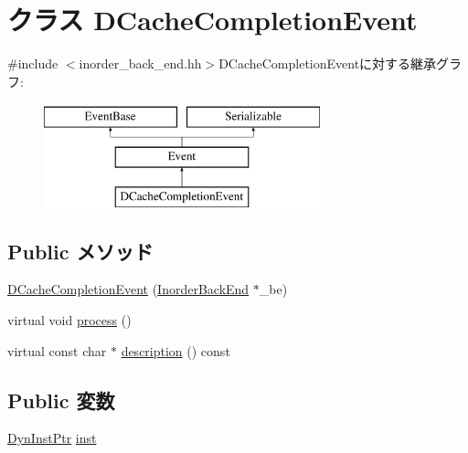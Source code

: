 \hypertarget{classInorderBackEnd_1_1DCacheCompletionEvent}{
\section{クラス DCacheCompletionEvent}
\label{classInorderBackEnd_1_1DCacheCompletionEvent}
}


{\ttfamily \#include $<$inorder\_\-back\_\-end.hh$>$}DCacheCompletionEventに対する継承グラフ:\begin{figure}[H]
\begin{center}
\leavevmode
\includegraphics[height=3cm]{classInorderBackEnd_1_1DCacheCompletionEvent}
\end{center}
\end{figure}
\subsection*{Public メソッド}
\begin{DoxyCompactItemize}
\item 
\hyperlink{classInorderBackEnd_1_1DCacheCompletionEvent_a58396b39cb5df3ad178cfed0d1992c1c}{DCacheCompletionEvent} (\hyperlink{classInorderBackEnd}{InorderBackEnd} $\ast$\_\-be)
\item 
virtual void \hyperlink{classInorderBackEnd_1_1DCacheCompletionEvent_a2e9c5136d19b1a95fc427e0852deab5c}{process} ()
\item 
virtual const char $\ast$ \hyperlink{classInorderBackEnd_1_1DCacheCompletionEvent_a5a14fe478e2393ff51f02e9b7be27e00}{description} () const 
\end{DoxyCompactItemize}
\subsection*{Public 変数}
\begin{DoxyCompactItemize}
\item 
\hyperlink{classInorderBackEnd_a028ce10889c5f6450239d9e9a7347976}{DynInstPtr} \hyperlink{classInorderBackEnd_1_1DCacheCompletionEvent_af5d4fb974eeb4507d4c837d365d0cefc}{inst}
\end{DoxyCompactItemize}
